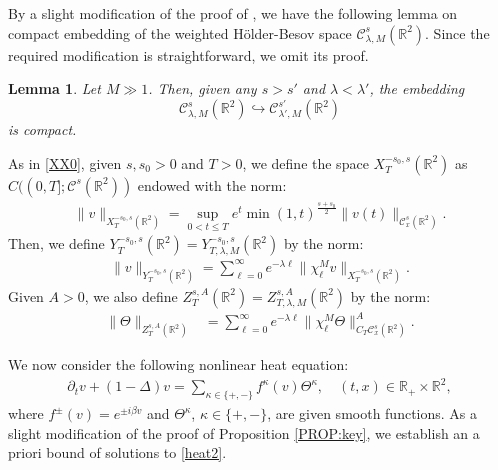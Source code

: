\documentclass[letterpaper, 11pt,  reqno]{amsart}
\newtheorem{lemma}[theorem]{Lemma}
\theoremstyle{myremark}
\newcommand{\Ta}{\Theta}
\newcommand{\1}{\hspace{0.5mm}\text{I}\hspace{0.5mm}}
\newcommand{\R}{\mathbb{R}}
\newcommand{\CC}{\mathcal{C}}
\newcommand{\be}{\beta}
\newcommand{\Dl}{\Delta}
\newcommand{\kk}{\kappa}
\newcommand{\ld}{\lambda}
\newcommand{\dt}{\partial_t}
\renewcommand{\l}{\ell}
\numberwithin{equation}{section}
\numberwithin{theorem}{section}
\begin{document}
By a slight modification of the proof of \cite[Lemma 2.2]{OTWZ}, 
we have the following lemma on compact embedding
of the weighted H\"older-Besov space $\CC^{s}_{\ld, M} (\R^2)$.
Since the required modification is straightforward, we omit its proof.

\begin{lemma}\label{LEM:cpt}
Let $M \gg 1$.
Then,  given any $s > s'$ and $\ld < \ld'$, 
the embedding
\[
\CC^{s}_{\ld, M} (\R^2) \hookrightarrow 
\CC^{s'}_{\ld', M} (\R^2)
\]
is compact.


\end{lemma}


As in \eqref{XX0}, 
given $s, s_0> 0$ and $T > 0$, 
we define the space $X^{-s_0,s}_T(\R^2)$ as $ C((0,T]; \CC^{s}(\R^2))$ endowed with the norm:
\begin{align}
\|v\|_{X^{-s_0,s}_T(\R^2)} = \sup_{0<t\le T} e^t \min(1,t)^{\frac{s+s_0}{2}} \|v(t)\|_{\CC_x^s(\R^2)}.
\label{A4}
\end{align}
Then, we define $Y^{-s_0,s}_T(\R^2)
= Y^{-s_0,s}_{T, \ld, M}(\R^2)$ 
by the norm: 
\begin{align}
\|v\|_{Y^{-s_0,s}_T(\R^2)}  = \sum_{\l = 0}^\infty e^{-\ld \l}  \|\chi^M_\l v\|_{X^{-s_0, s}_T(\R^2)}.
\label{A5}
\end{align}
Given $A > 0$, we also define
$Z^{s, A}_T(\R^2)= Z^{s, A}_{T, \ld, M}(\R^2)$ by the norm:
\begin{align}
\|\Ta\|_{Z^{s, A}_{T}(\R^2)} & = \sum_{\l =  0}^\infty e^{-\ld \l} \|\chi^M_\l\Ta\|^A_{C_T\CC^s_x(\R^2)}.
\label{A6}
\end{align}




We now consider the following nonlinear heat equation:
\begin{align}
\dt v + (1- \Dl) v = \sum_{\kk \in \{+, -\}} f^\kk(v) \Ta^\kk , \quad (t,x) \in \R_+ \times \R^2,
\label{heat2}
\end{align}
where $f^\pm(v) = e^{\pm i \be v}$
and $\Ta^\kk$, $\kk \in \{+, -\}$, 
are given smooth functions.
As a slight modification of the proof of Proposition \ref{PROP:key}, 
we establish an a priori bound of solutions to \eqref{heat2}. 
\end{document}
